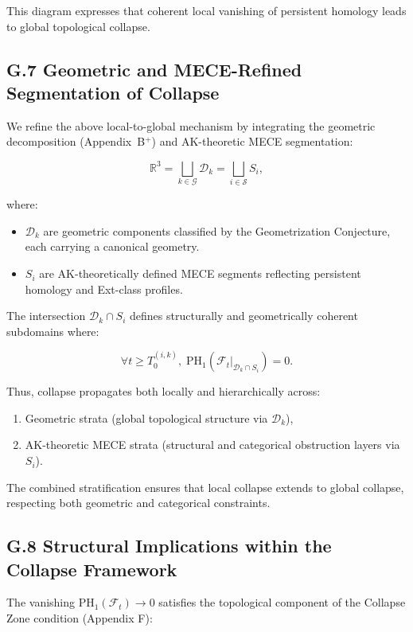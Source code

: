 \documentclass[11pt]{article}
\begin{document}
This diagram expresses that coherent local vanishing of persistent homology leads to global topological collapse.

\subsection*{G.7 Geometric and MECE-Refined Segmentation of Collapse}

We refine the above local-to-global mechanism by integrating the geometric decomposition (Appendix~B$^+$) and AK-theoretic MECE segmentation:

\[
\mathbb{R}^3 = \bigsqcup_{k \in \mathcal{G}} \mathcal{D}_k = \bigsqcup_{i \in \mathcal{S}} S_i,
\]

where:

\begin{itemize}
  \item \( \mathcal{D}_k \) are geometric components classified by the Geometrization Conjecture, each carrying a canonical geometry.
  \item \( S_i \) are AK-theoretically defined MECE segments reflecting persistent homology and Ext-class profiles.
\end{itemize}

The intersection \( \mathcal{D}_k \cap S_i \) defines structurally and geometrically coherent subdomains where:

\[
\forall t \geq T_0^{(i,k)},\; \mathrm{PH}_1(\mathcal{F}_t|_{\mathcal{D}_k \cap S_i}) = 0.
\]

Thus, collapse propagates both locally and hierarchically across:

\begin{enumerate}
  \item Geometric strata (global topological structure via \( \mathcal{D}_k \)),
  \item AK-theoretic MECE strata (structural and categorical obstruction layers via \( S_i \)).
\end{enumerate}

The combined stratification ensures that local collapse extends to global collapse, respecting both geometric and categorical constraints.

\subsection*{G.8 Structural Implications within the Collapse Framework}

The vanishing \( \mathrm{PH}_1(\mathcal{F}_t) \to 0 \) satisfies the topological component of the Collapse Zone condition (Appendix F):
\end{document}
